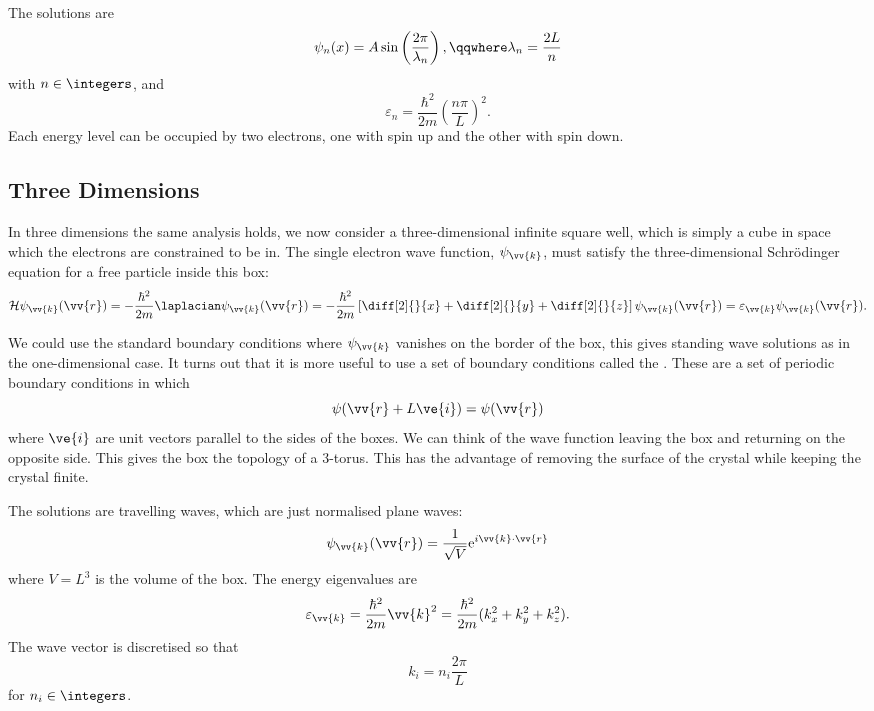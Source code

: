 \documentclass[fleqn]{NotesClass}
\newcommand*{\e}{\mathrm{e}}
\newcommand*{\hamiltonian}{\mathcal{H}}
\begin{document}
    The solutions are
    \begin{equation}
        \psi_n(x) = A\sin\left( \frac{2\pi}{\lambda_n} \right), \qqwhere \lambda_n = \frac{2 L}{n}
    \end{equation}
    with \(n \in \integers\), and
    \begin{equation}
        \varepsilon_n = \frac{\hbar^2}{2m} \left( \frac{n\pi}{L} \right)^2.
    \end{equation}
    Each energy level can be occupied by two electrons, one with spin up and the other with spin down.
    
    \subsection{Three Dimensions}
    In three dimensions the same analysis holds, we now consider a three-dimensional infinite square well, which is simply a cube in space which the electrons are constrained to be in.
    The single electron wave function, \(\psi_{\vv{k}}\), must satisfy the three-dimensional Schr\"odinger equation for a free particle inside this box:
    \begin{equation}
        \hamiltonian\psi_{\vv{k}}(\vv{r}) = -\frac{\hbar^2}{2m}\laplacian \psi_{\vv{k}}(\vv{r}) = -\frac{\hbar^2}{2m} \left[ \diff[2]{}{x} + \diff[2]{}{y} + \diff[2]{}{z} \right]\psi_{\vv{k}}(\vv{r}) = \varepsilon_{\vv{k}}\psi_{\vv{k}}(\vv{r}).
    \end{equation}
    
    We could use the standard boundary conditions where \(\psi_{\vv{k}}\) vanishes on the border of the box, this gives standing wave solutions as in the one-dimensional case.
    It turns out that it is more useful to use a set of boundary conditions called the .
    These are a set of periodic boundary conditions in which
    \begin{equation}
        \psi(\vv{r} + L\ve{i}) = \psi(\vv{r})
    \end{equation}
    where \(\ve{i}\) are unit vectors parallel to the sides of the boxes.
    We can think of the wave function leaving the box and returning on the opposite side.
    This gives the box the topology of a 3-torus.
    This has the advantage of removing the surface of the crystal while keeping the crystal finite.
    
    The solutions are travelling waves, which are just normalised plane waves:
    \begin{equation}
        \psi_{\vv{k}}(\vv{r}) = \frac{1}{\sqrt{V}} \e^{i\vv{k} \cdot \vv{r}}
    \end{equation}
    where \(V = L^3\) is the volume of the box.
    The energy eigenvalues are 
    \begin{equation}
        \varepsilon_{\vv{k}} = \frac{\hbar^2}{2m}\vv{k}^2 = \frac{\hbar^2}{2m}(k_x^2 + k_y^2 + k_z^2).
    \end{equation}
    The wave vector is discretised so that
    \begin{equation}
        k_i = n_i\frac{2\pi}{L}
    \end{equation}
    for \(n_i \in \integers\).
    
\end{document}
